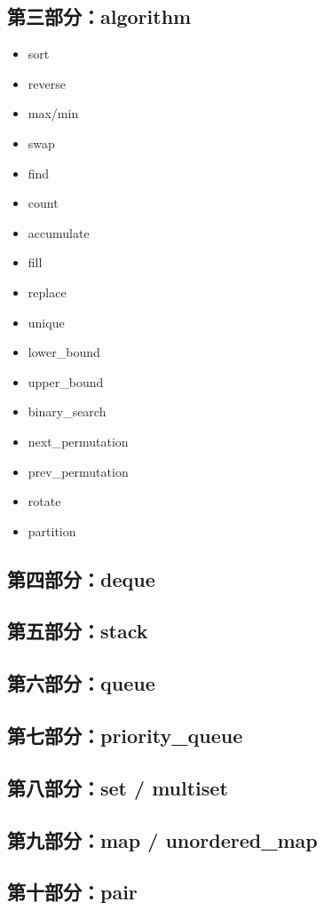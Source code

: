 \documentclass[9pt,twocolumn]{extarticle}
\begin{document}
\subsection*{第三部分：algorithm}
\begin{itemize}
    \item sort
    \item reverse
    \item max/min
    \item swap
    \item find
    \item count
    \item accumulate
    \item fill
    \item replace
    \item unique
    \item lower\_bound
    \item upper\_bound
    \item binary\_search
    \item next\_permutation
    \item prev\_permutation
    \item rotate
    \item partition
\end{itemize}

\subsection*{第四部分：deque}
\subsection*{第五部分：stack}
\subsection*{第六部分：queue}
\subsection*{第七部分：priority\_queue}
\subsection*{第八部分：set / multiset}
\subsection*{第九部分：map / unordered\_map}
\subsection*{第十部分：pair}
\end{document}
